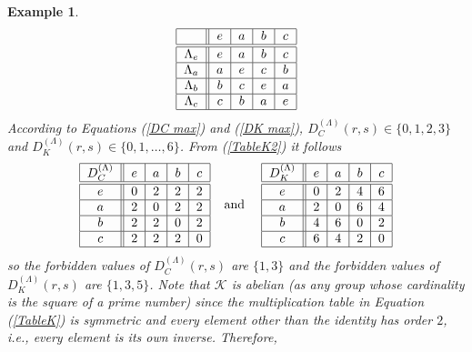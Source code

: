\documentclass{article}
\newtheorem{example}[theorem]{Example}
\begin{document}
\begin{example}
\begin{equation}
\begin{tabular}{|c||c|c|c|c|}
\hline
& $e$ & $a$ & $b$ & $c$ \\ \hline\hline
$\Lambda _{e}$ & $e$ & $a$ & $b$ & $c$ \\ \hline
$\Lambda _{a}$ & $a$ & $e$ & $c$ & $b$ \\ \hline
$\Lambda _{b}$ & $b$ & $c$ & $e$ & $a$ \\ \hline
$\Lambda _{c}$ & $c$ & $b$ & $a$ & $e$ \\ \hline
\end{tabular}
\label{TableK2}
\end{equation}%
According to Equations (\ref{DC max}) and (\ref{DK max}), $D_{C}^{(\Lambda
)}(r,s)\in \{0,1,2,3\}$ and $D_{K}^{(\Lambda )}(r,s)\in \{0,1,\ldots,6\}$. From
(\ref{TableK2}) it follows 
\begin{equation}
\begin{tabular}{|c||c|c|c|c|}
\hline
$D_{C}^{(\Lambda )}$ & $e$ & $a$ & $b$ & $c$ \\ \hline\hline
$e$ & $0$ & $2$ & $2$ & $2$ \\ \hline
$a$ & $2$ & $0$ & $2$ & $2$ \\ \hline
$b$ & $2$ & $2$ & $0$ & $2$ \\ \hline
$c$ & $2$ & $2$ & $2$ & $0$ \\ \hline
\end{tabular}%
\;\;\;\;\text{and\ \ \ \ }%
\begin{tabular}{|c||c|c|c|c|}
\hline
$D_{K}^{(\Lambda )}$ & $e$ & $a$ & $b$ & $c$ \\ \hline\hline
$e$ & $0$ & $2$ & $4$ & $6$ \\ \hline
$a$ & $2$ & $0$ & $6$ & $4$ \\ \hline
$b$ & $4$ & $6$ & $0$ & $2$ \\ \hline
$c$ & $6$ & $4$ & $2$ & $0$ \\ \hline
\end{tabular}
\label{F and Dist for K}
\end{equation}%
so the forbidden values of $D_{C}^{(\Lambda )}(r,s)$ are $\{1,3\}$ and the
forbidden values of $D_{K}^{(\Lambda )}(r,s)$ are $\{1,3,5\}$. Note that $%
\mathcal{K}$ is abelian (as any group whose cardinality is the square of a
prime number) since the multiplication table
 in Equation (\ref{TableK}) is
symmetric and every element other than the identity has order $2$, i.e.,
every element is its own inverse. Therefore, 
\begin{equation*}

\end{equation*}
\end{example}
\end{document}
